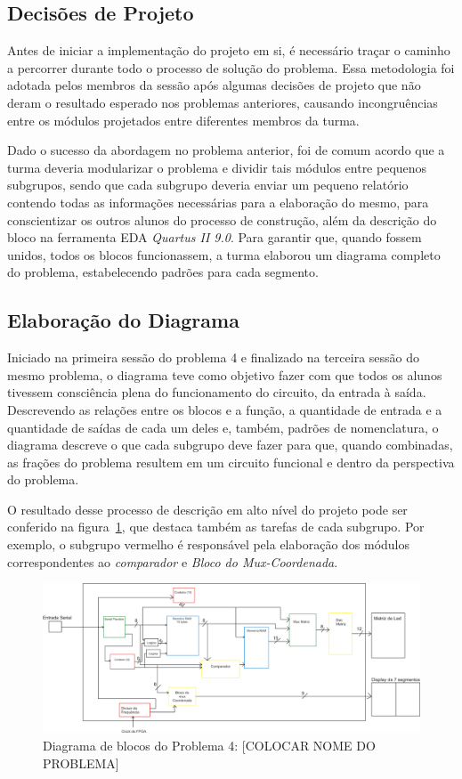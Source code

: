 \documentclass[12pt]{article}
\begin{document}
\subsection{Decisões de Projeto}

Antes de iniciar a implementação do projeto em si, é necessário traçar o caminho a percorrer durante todo o processo de solução do problema. Essa metodologia foi adotada pelos membros da sessão após algumas decisões de projeto que não deram o resultado esperado nos problemas anteriores, causando incongruências entre os módulos projetados entre diferentes membros da turma. 

Dado o sucesso da abordagem no problema anterior, foi de comum acordo  que a turma deveria modularizar o problema e dividir tais módulos entre pequenos subgrupos, sendo que cada subgrupo deveria enviar um pequeno relatório contendo todas as informações necessárias para a elaboração do mesmo, para conscientizar os outros alunos do processo de construção, além da descrição do bloco na ferramenta EDA \textit{Quartus II 9.0}. Para garantir que, quando fossem unidos, todos os blocos funcionassem, a turma elaborou um diagrama completo do problema, estabelecendo padrões para cada segmento.

\subsection{Elaboração do Diagrama}
Iniciado na primeira sessão do problema 4 e finalizado na terceira sessão do mesmo problema, o diagrama teve como objetivo fazer com que todos os alunos tivessem consciência plena do funcionamento do circuito, da entrada à saída. Descrevendo as relações entre os blocos e a função, a quantidade de entrada e a quantidade de saídas de cada um deles e, também,  padrões de nomenclatura, o diagrama descreve o que cada subgrupo deve fazer para que, quando combinadas, as frações do problema resultem em um circuito funcional e dentro da perspectiva do problema. 

O resultado desse processo de descrição em alto nível do projeto pode ser conferido na figura~\ref{fig:diagrama}, que destaca também as tarefas de cada subgrupo. Por exemplo, o subgrupo vermelho é responsável pela elaboração dos módulos correspondentes ao \textit{comparador} e \textit{Bloco do Mux-Coordenada}.

\begin{figure}[!htbp]
\centering
\includegraphics[width=1\textwidth]{img/p4/diagrama.png}
\caption{Diagrama de blocos do Problema 4: [COLOCAR NOME DO PROBLEMA]}
\label{fig:diagrama}
\end{figure}
\end{document}
